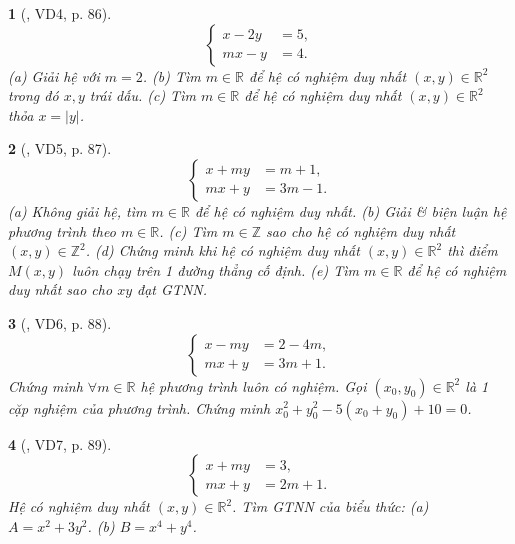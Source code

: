 \documentclass{article}
\newtheorem{baitoan}{}
\begin{document}
\begin{baitoan}[\cite{Kien_dai_so_9}, VD4, p. 86]
	\begin{equation*}
		\left\{\begin{split}
			x - 2y &= 5,\\
			mx - y &= 4.
		\end{split}\right.
	\end{equation*}
	(a) Giải hệ với $m = 2$. (b) Tìm $m\in\mathbb{R}$ để hệ có nghiệm duy nhất $(x,y)\in\mathbb{R}^2$ trong đó $x,y$ trái dấu. (c) Tìm $m\in\mathbb{R}$ để hệ có nghiệm duy nhất $(x,y)\in\mathbb{R}^2$ thỏa $x = |y|$.
\end{baitoan}

\begin{baitoan}[\cite{Kien_dai_so_9}, VD5, p. 87]
	\begin{equation*}
		\left\{\begin{split}
			x + my &= m + 1,\\
			mx + y &= 3m - 1.
		\end{split}\right.
	\end{equation*}
	(a) Không giải hệ, tìm $m\in\mathbb{R}$ để hệ có nghiệm duy nhất. (b) Giải \& biện luận hệ phương trình theo $m\in\mathbb{R}$. (c) Tìm $m\in\mathbb{Z}$ sao cho hệ có nghiệm duy nhất $(x,y)\in\mathbb{Z}^2$. (d) Chứng minh khi hệ có nghiệm duy nhất $(x,y)\in\mathbb{R}^2$ thì điểm $M(x,y)$ luôn chạy trên 1 đường thẳng cố định. (e) Tìm $m\in\mathbb{R}$ để hệ có nghiệm duy nhất sao cho $xy$ đạt {\rm GTNN}.
\end{baitoan}

\begin{baitoan}[\cite{Kien_dai_so_9}, VD6, p. 88]
	\begin{equation*}
		\left\{\begin{split}
			x - my &= 2 - 4m,\\
			mx + y &= 3m + 1.
		\end{split}\right.
	\end{equation*}
	Chứng minh $\forall m\in\mathbb{R}$ hệ phương trình luôn có nghiệm. Gọi $(x_0,y_0)\in\mathbb{R}^2$ là 1 cặp nghiệm của phương trình. Chứng minh $x_0^2 + y_0^2 - 5(x_0 + y_0) + 10 = 0$.
\end{baitoan}

\begin{baitoan}[\cite{Kien_dai_so_9}, VD7, p. 89]
	\begin{equation*}
		\left\{\begin{split}
			x + my &= 3,\\
			mx + y &= 2m + 1.
		\end{split}\right.
	\end{equation*}
	Hệ có nghiệm duy nhất $(x,y)\in\mathbb{R}^2$. Tìm {\rm GTNN} của biểu thức: (a) $A = x^2 + 3y^2$. (b) $B = x^4 + y^4$.
\end{baitoan}
\end{document}
